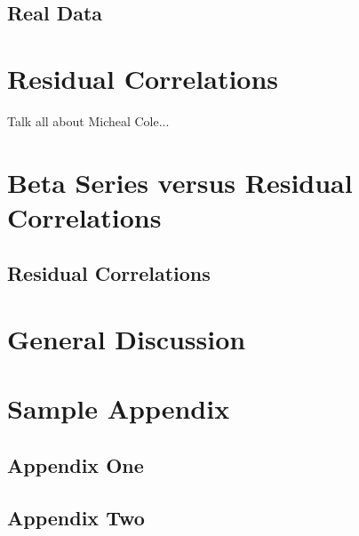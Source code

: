 \documentclass[phd,appendix,figures]{uithesis}
\begin{document}
\section{Real Data}

\chapter{Residual Correlations}
Talk all about Micheal Cole...

\chapter{Beta Series versus Residual Correlations}

\section{Residual Correlations}


\chapter{General Discussion}

\appendix

\chapter{Sample Appendix}

\section{Appendix One}
\blindtext

\section{Appendix Two}
\blindtext
\end{document}
